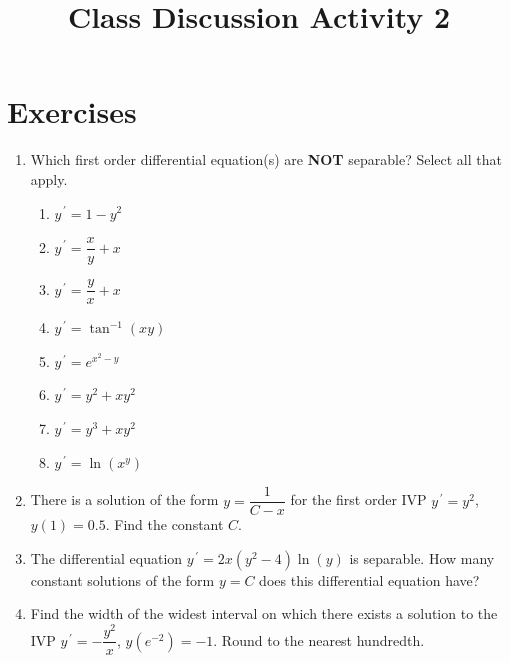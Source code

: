 \documentclass{ximera}
\begin{document}
\begin{abstract}
 \end{abstract}

    \title{Class Discussion Activity 2}
    
    \maketitle

\section*{Exercises}

\begin{enumerate}[label=(\arabic*)]



\item Which first order differential equation(s) are \textbf{NOT} separable?  Select all that apply.

\begin{enumerate}[label=(\alph*)]
\item $y^{\,\prime}=1-y^2$
\item $y^{\,\prime}=\dfrac{x}{y}+x$
\item $y^{\,\prime}=\dfrac{y}{x}+x$  %
\item $y^{\,\prime}=\tan^{-1}(xy)$ %
\item $y^{\,\prime}=e^{x^2-y}$
\item $y^{\,\prime}=y^2+xy^2$
\item $y^{\,\prime}=y^3+xy^2$ %
\item $y^{\,\prime}=\ln \left(x^y\right)$
\end{enumerate}


\item There is a solution of the form $y=\dfrac{1}{C-x}$ for the first order IVP $y^{\,\prime}=y^2$, $y(1)=0.5$.  Find the constant $C$.


\item The differential equation $y^{\,\prime}=2x(y^2-4)\ln (y)$ is separable. How many constant solutions of the form $y=C$ does this differential equation have? 


\item Find the width of the widest interval on which there exists a solution to the IVP $y^{\,\prime}=-\dfrac{y^2}{x}$, $y(e^{-2})=-1$.  Round to the nearest hundredth.


\end{enumerate}
\end{document}
